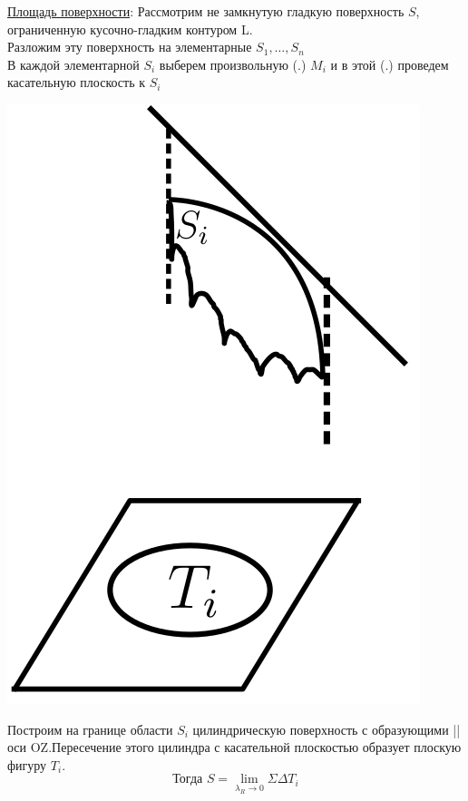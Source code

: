 \documentclass[12pt]{article}
\let\ORIincludegraphics\includegraphics
\renewcommand{\includegraphics}[2][]{\ORIincludegraphics[scale=0.65,#1]{#2}}
\let\oldlim\lim
\renewcommand{\lim}{\oldlim\limits}
\begin{document}
  \underline{Площадь поверхности}: Рассмотрим не замкнутую гладкую поверхность $S$, ограниченную
  кусочно-гладким контуром L.\\
  Разложим эту поверхность на элементарные $S_1,\dots,S_n$\\
  В каждой элементарной $S_i$ выберем произвольную (.) $M_i$ и в этой (.) проведем касательную
  плоскость к $S_i$\\
  \par
  \begin{minipage}{0.45\textwidth}
    \includegraphics[scale=0.6]{8.18.2.png}
  \end{minipage}
  \hspace{1em}
  \begin{minipage}{0.55\textwidth}
    Построим на границе области $S_i$ цилиндрическую поверхность с образующими || оси OZ.Пересечение
    этого цилиндра с касательной плоскостью образует плоскую фигуру $T_i$.
    \[\text{Тогда }S=\lim_{\lambda_R \to 0} \Sigma \Delta T_i\]
  \end{minipage}
\end{document}
